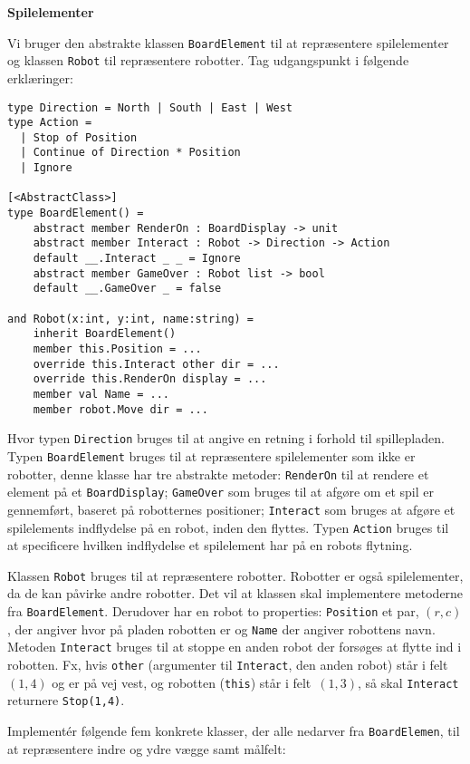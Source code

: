 \textbf{Spilelementer}

Vi bruger den abstrakte klassen \lstinline{BoardElement} til at
repræsentere spilelementer og klassen \lstinline{Robot} til
repræsentere robotter. Tag udgangspunkt i følgende
erklæringer:

\begin{lstlisting}
type Direction = North | South | East | West
type Action =
  | Stop of Position
  | Continue of Direction * Position
  | Ignore

[<AbstractClass>]
type BoardElement() =
    abstract member RenderOn : BoardDisplay -> unit
    abstract member Interact : Robot -> Direction -> Action
    default __.Interact _ _ = Ignore
    abstract member GameOver : Robot list -> bool
    default __.GameOver _ = false

and Robot(x:int, y:int, name:string) =
    inherit BoardElement()
    member this.Position = ...
    override this.Interact other dir = ...
    override this.RenderOn display = ...
    member val Name = ...
    member robot.Move dir = ...
\end{lstlisting}

Hvor typen \lstinline{Direction} bruges til at angive en retning i
forhold til spillepladen. Typen \lstinline{BoardElement} bruges til at
repræsentere spilelementer som ikke er robotter, denne klasse har tre
abstrakte metoder: \lstinline{RenderOn} til at rendere et element på
et \lstinline{BoardDisplay}; \lstinline{GameOver} som bruges til at
afgøre om et spil er gennemført, baseret på robotternes positioner;
\lstinline{Interact} som bruges at afgøre et spilelements indflydelse
på en robot, inden den flyttes. Typen \lstinline{Action} bruges til at
specificere hvilken indflydelse et spilelement har på en robots
flytning.

Klassen \lstinline{Robot} bruges til at repræsentere
robotter. Robotter er også spilelementer, da de kan påvirke andre
robotter. Det vil at klassen skal implementere metoderne fra
\lstinline{BoardElement}. Derudover har en robot to properties:
\lstinline{Position} et par, $(r,c)$, der angiver hvor
på pladen robotten er og \lstinline{Name} der angiver robottens
navn. Metoden \lstinline{Interact} bruges til at stoppe en anden robot
der forsøges at flytte ind i robotten. Fx, hvis \lstinline{other}
(argumenter til \lstinline{Interact}, den anden robot) står i
felt~$(1,4)$ og er på vej vest, og robotten (\lstinline{this}) står i
felt~$(1,3)$, så skal \lstinline{Interact} returnere \lstinline{Stop(1,4)}.


Implementér følgende fem konkrete klasser, der alle nedarver fra
\lstinline{BoardElemen}, til at repræsentere indre og ydre vægge samt målfelt:

